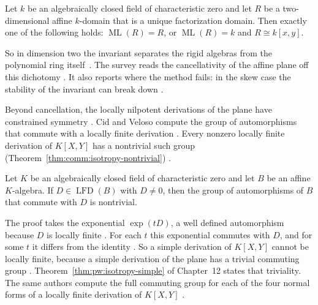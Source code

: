 \begin{theorem}\label{thm:comm:ml-dichotomy}
Let $k$ be an algebraically closed field of characteristic zero and let $R$
be a two-dimensional affine $k$-domain that is a unique factorization
domain. Then exactly one of the following holds: $\operatorname{ML}(R) = R$,
or $\operatorname{ML}(R) = k$ and $R \cong k[x,y]$.
\end{theorem}

So in dimension two the invariant separates the rigid algebras from the
polynomial ring itself~\cite[pp.~2--3]{VenegasVenegas2025Cancellation}. The survey reads the cancellativity of the affine
plane off this dichotomy \cite[Theorem~2.3,
p.~7]{VenegasVenegas2025Cancellation}. It also reports where the method fails:
in the skew case the stability of the invariant can break down
\cite[pp.~2--3]{VenegasVenegas2025Cancellation}.

Beyond cancellation, the locally nilpotent derivations of the plane have
constrained symmetry \cite[p.~1]{CidVeloso2026Isotropy}. Cid and Veloso
compute the group of automorphisms that commute with a locally finite
derivation \cite[p.~1]{CidVeloso2026Isotropy}. Every nonzero locally finite
derivation of $K[X,Y]$ has a nontrivial such group
(Theorem~\ref{thm:comm:isotropy-nontrivial}) \cite[Proposition~3.1,
p.~3]{CidVeloso2026Isotropy}.

\begin{theorem}\label{thm:comm:isotropy-nontrivial}
Let $K$ be an algebraically closed field of characteristic zero and let $B$
be an affine $K$-algebra. If $D \in \operatorname{LFD}(B)$ with $D \neq 0$,
then the group of automorphisms of $B$ that commute with $D$ is nontrivial.
\end{theorem}

The proof takes the exponential $\exp(tD)$, a well defined automorphism
because $D$ is locally finite \cite[p.~4]{CidVeloso2026Isotropy}. For each $t$
this exponential commutes with $D$, and for some $t$ it differs from the
identity \cite[p.~4]{CidVeloso2026Isotropy}. So a simple derivation of
$K[X,Y]$ cannot be locally finite, because a simple derivation of the plane
has a trivial commuting group \cite[p.~4]{CidVeloso2026Isotropy}.
Theorem~\ref{thm:pw:isotropy-simple} of Chapter~12 states that triviality. The
same authors compute the full commuting group for each of the four normal
forms of a locally finite derivation of $K[X,Y]$ \cite[Theorems~3.3--3.9,
pp.~4--8]{CidVeloso2026Isotropy}.

